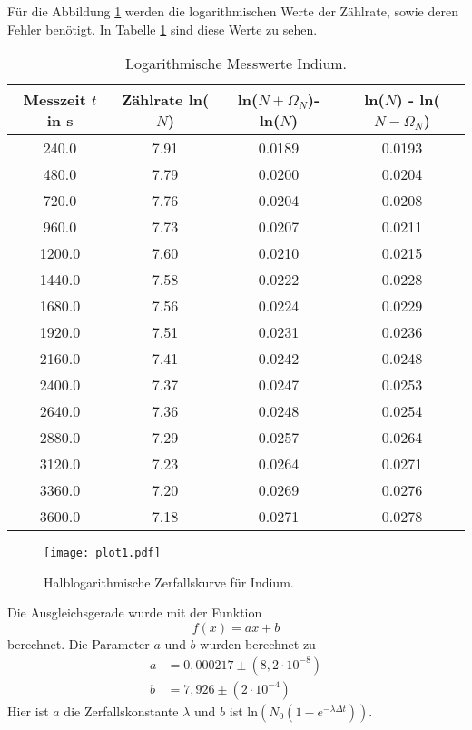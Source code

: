 Für die Abbildung \ref{fig:plot1} werden die logarithmischen Werte der Zählrate, sowie deren Fehler benötigt.
In Tabelle \ref{tab:lnN1} sind diese Werte zu sehen.

\begin{table}
  \centering
  \caption{Logarithmische Messwerte Indium.}
  \label{tab:lnN1}
\begin{tabular}{c c c c}
  \toprule
  Messzeit $t$ in s & Zählrate ln($N$) & ln($N + \Omega_N$)- ln($N$) & ln($N$) - ln($N - \Omega_N$)\\
  \midrule
  240.0 & 7.91 & 0.0189 & 0.0193 \\
  480.0 & 7.79 & 0.0200 & 0.0204 \\
  720.0 & 7.76 & 0.0204 & 0.0208 \\
  960.0 & 7.73 & 0.0207 & 0.0211 \\
  1200.0 & 7.60 & 0.0210 & 0.0215 \\
  1440.0 & 7.58 & 0.0222 & 0.0228 \\
  1680.0 & 7.56 & 0.0224 & 0.0229 \\
  1920.0 & 7.51 & 0.0231 & 0.0236 \\
  2160.0 & 7.41 & 0.0242 & 0.0248 \\
  2400.0 & 7.37 & 0.0247 & 0.0253 \\
  2640.0 & 7.36 & 0.0248 & 0.0254 \\
  2880.0 & 7.29 & 0.0257 & 0.0264 \\
  3120.0 & 7.23 & 0.0264 & 0.0271 \\
  3360.0 & 7.20 & 0.0269 & 0.0276 \\
  3600.0 & 7.18 & 0.0271 & 0.0278 \\
  \bottomrule
\end{tabular}
\end{table}
\FloatBarrier

\begin{figure}
  \centering
  \texttt{[image: plot1.pdf]}
  \caption{Halblogarithmische Zerfallskurve für Indium.}
  \label{fig:plot1}
\end{figure}
\FloatBarrier

Die Ausgleichsgerade wurde mit der Funktion
\begin{equation}
  f(x) = ax +b
  \label{eqn:glFit}
\end{equation}
berechnet.
Die Parameter $a$ und $b$ wurden berechnet zu 
\begin{align*}
  a &= 0,000217 \pm (8,2 \cdot 10^{-8}) \\
  b &= 7,926 \pm (2 \cdot 10^{-4})
\end{align*}
Hier ist $a$ die Zerfallskonstante $\lambda$ und $b$ ist $\text{ln}(N_0(1-e^{-\lambda \Delta t}))$. \\

